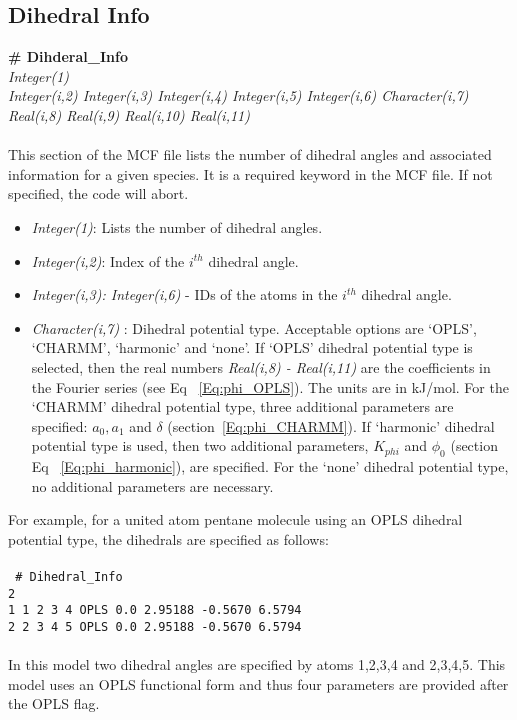 \subsection{Dihedral Info}\label{sec:Get_Dihedral_Info}
%
{\bf \# Dihderal\_Info} \\ 
%
{\it Integer(1)} \\
%
{\it Integer(i,2) Integer(i,3) Integer(i,4) Integer(i,5) Integer(i,6)
  Character(i,7) Real(i,8) Real(i,9) Real(i,10) Real(i,11)} \\ \\
%
This section of the MCF file lists the number of dihedral angles and 
associated information for a given species. It is a required keyword in the MCF file. 
If not specified, the code
will abort.  

\begin{itemize}
%
\item {\it Integer(1)}: Lists the number of dihedral angles. 
%
\item {\it Integer(i,2)}: Index of the $i^{th}$ dihedral angle. 
%
\item {\it Integer(i,3): Integer(i,6)} - IDs of the atoms in the $i^{th}$
dihedral angle. 
%
\item {\it Character(i,7) }: Dihedral potential type. Acceptable options
are `OPLS', `CHARMM', `harmonic' and `none'. If `OPLS' dihedral
potential type is selected, then the real numbers {\it Real(i,8) -
  Real(i,11)} are the coefficients in the Fourier series
(see Eq ~\ref{Eq:phi_OPLS}). The units are in kJ/mol. For the `CHARMM'
dihedral potential type, three additional parameters are specified:
$a_0, a_1$ and $\delta$ (section~\ref{Eq:phi_CHARMM}).  If `harmonic' dihedral
potential type is used, then two additional parameters, $K_{phi}$ and
$\phi_0$ (section Eq ~\ref{Eq:phi_harmonic}), are specified.  For the `none' dihedral potential
type, no additional parameters are necessary.

\end{itemize}
%
For example, for a united atom pentane molecule using an OPLS dihedral potential type, 
the dihedrals are specified as follows:\\ \\
%
\texttt{
\# Dihedral\_Info\\
2\\
1    1    2    3    4    OPLS     0.0     2.95188     -0.5670     6.5794\\
2    2    3    4    5    OPLS     0.0     2.95188     -0.5670     6.5794\\
}\\
%
In this model two dihedral angles are specified by atoms 1,2,3,4 and 2,3,4,5. 
This model uses an OPLS functional form and thus four parameters are provided
after the OPLS flag.
%
